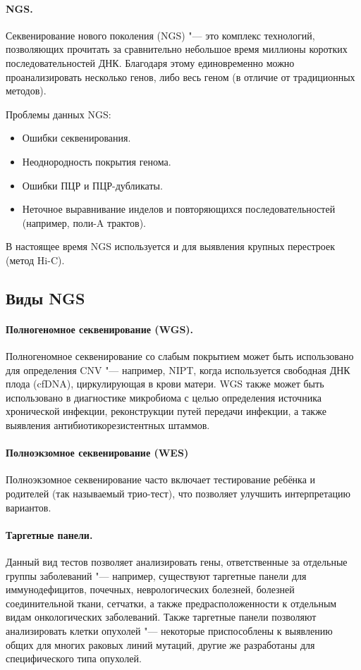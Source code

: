 \documentclass[a4paper,12pt]{article}
\begin{document}
\paragraph{NGS.}
Секвенирование нового поколения (NGS) "--- это комплекс технологий, позволяющих прочитать за сравнительно небольшое время миллионы коротких последовательностей ДНК.
Благодаря этому единовременно можно проанализировать несколько генов, либо весь геном (в отличие от традиционных методов).


Проблемы данных NGS:

\begin{itemize}
\item Ошибки секвенирования.
\item Неоднородность покрытия генома.
\item Ошибки ПЦР и ПЦР-дубликаты.
\item Неточное выравнивание инделов и повторяющихся последовательностей (например, поли-A трактов).
\end{itemize}

В настоящее время NGS используется и для выявления крупных перестроек (метод Hi-C).

\subsection{Виды NGS}

\paragraph{Полногеномное секвенирование (WGS).}

Полногеномное секвенирование со слабым покрытием может быть использовано для определения CNV "--- например, NIPT, когда используется свободная ДНК плода (cfDNA), циркулирующая в крови матери\cite{yu}.
WGS также может быть использовано в диагностике микробиома с целью определения источника хронической инфекции, реконструкции путей передачи инфекции, а также выявления антибиотикорезистентных штаммов\cite{balloux}.

\paragraph{Полноэкзомное секвенирование (WES)}
Полноэкзомное секвенирование часто включает тестирование ребёнка и родителей (так называемый трио-тест), что позволяет улучшить интерпретацию вариантов\cite{yohe}.

\paragraph{Таргетные панели.}
Данный вид тестов позволяет анализировать гены, ответственные за отдельные группы заболеваний "--- например, существуют таргетные панели для иммунодефицитов, почечных, неврологических болезней, болезней соединительной ткани, сетчатки, а также предрасположенности к отдельным видам онкологических заболеваний.
Также таргетные панели позволяют анализировать клетки опухолей "--- некоторые приспособлены к выявлению общих для многих раковых линий мутаций, другие же разработаны для специфического типа опухолей\cite{yohe}.
\end{document}
